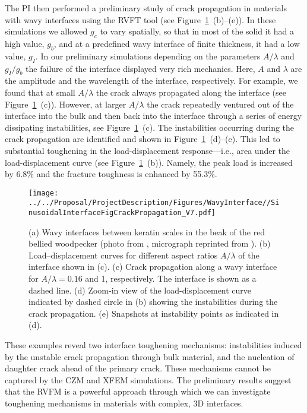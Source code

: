 \documentclass[10pt,letterpaper]{article}
\begin{document}


    The PI then performed a preliminary study of crack propagation in materials with wavy interfaces using the RVFT tool (see Figure~\ref{f:VFTprelimresults}~(b)--(e)).
    In these simulations we allowed $g_c$ to vary spatially, so that in most of the solid it had a high value, $g_{b}$, and at a predefined wavy interface of finite thickness, it had a low value, $g_{I}$.
    In our preliminary simulations depending on the parameters $A/\lambda$ and $g_{I}/g_{b}$ the failure of the interface displayed very rich mechanics.
    Here, $A$ and $\lambda$ are the amplitude and the wavelength of the interface, respectively.
    For example, we found that at small $A/\lambda$ the crack always propagated  along the interface (see Figure~\ref{f:VFTprelimresults}~(c)).
    However, at larger $A/\lambda$ the crack repeatedly ventured out of the interface into the bulk and then back into the interface through a series of energy dissipating instabilities, see Figure~\ref{f:VFTprelimresults}~(c).
    The instabilities occurring during the crack propagation are identified and shown in Figure~\ref{f:VFTprelimresults}~(d)--(e).
    This led to substantial toughening in the load-displacement response---i.e., area under the load-displacement curve (see Figure~\ref{f:VFTprelimresults}~(b)).
    Namely, the peak load is increased by 6.8\% and the fracture toughness is enhanced by 55.3\%.
    \begin{figure}[h]
      \texttt{[image: ../../Proposal/ProjectDescription/Figures/WavyInterface//SinusoidalInterfaceFigCrackPropagation\_V7.pdf]}
      \centering
      \caption{ \footnotesize (a) Wavy interfaces between keratin scales in the beak of the red bellied woodpecker (photo from \cite{birdpicture1}, micrograph reprinted from \cite{lee2014hierarchical}). (b) Load--displacement curves for different aspect ratios $A/\lambda$ of the interface shown in (c). (c) Crack propagation along a wavy interface for $A/\lambda = 0.16$ and 1, respectively. The interface is shown as a dashed line. (d) Zoom-in view of the load-displacement curve indicated by dashed circle in (b) showing the instabilities during the crack propagation. (e) Snapshots at instability points as indicated in (d).
      }
      \label{f:VFTprelimresults}
    \end{figure}

    These examples reveal two interface toughening mechanisms: instabilities induced by the unstable crack propagation through bulk material, and the nucleation of daughter crack ahead of the primary crack. These mechanisms cannot be captured by the CZM and XFEM simulations. The preliminary results suggest that the RVFM is a powerful approach through which we can investigate toughening mechanisms in materials with complex, 3D interfaces.
\end{document}
